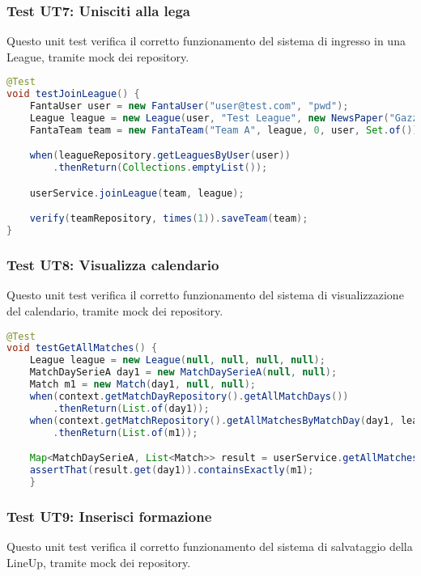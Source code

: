 \subsubsection{Test UT7: Unisciti alla lega} \label{UT7}

Questo unit test verifica il corretto funzionamento del sistema di ingresso in una League,
tramite mock dei repository.

\begin{lstlisting}[language=Java]
@Test
void testJoinLeague() {
	FantaUser user = new FantaUser("user@test.com", "pwd");
	League league = new League(user, "Test League", new NewsPaper("Gazzetta"), "L002");
	FantaTeam team = new FantaTeam("Team A", league, 0, user, Set.of());

	when(leagueRepository.getLeaguesByUser(user))
        .thenReturn(Collections.emptyList());

	userService.joinLeague(team, league);

	verify(teamRepository, times(1)).saveTeam(team);
}
\end{lstlisting}


\subsubsection{Test UT8: Visualizza calendario} \label{UT8}

Questo unit test verifica il corretto funzionamento del sistema di visualizzazione del calendario,
tramite mock dei repository.

\begin{lstlisting}[language=Java]
@Test
void testGetAllMatches() {
	League league = new League(null, null, null, null);
	MatchDaySerieA day1 = new MatchDaySerieA(null, null);
	Match m1 = new Match(day1, null, null);
	when(context.getMatchDayRepository().getAllMatchDays())
        .thenReturn(List.of(day1));
	when(context.getMatchRepository().getAllMatchesByMatchDay(day1, league))
        .thenReturn(List.of(m1));

	Map<MatchDaySerieA, List<Match>> result = userService.getAllMatches(league);
	assertThat(result.get(day1)).containsExactly(m1);
	}
\end{lstlisting}


\subsubsection{Test UT9: Inserisci formazione} \label{UT9}

Questo unit test verifica il corretto funzionamento del sistema di salvataggio della LineUp,
tramite mock dei repository.


